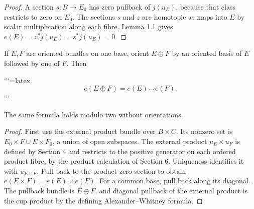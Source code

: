 \begin{proof}
A section \(s:B\to E_0\) has zero pullback of \(j(u_E)\), because that class restricts to zero on \(E_0\). The sections \(s\) and \(z\) are homotopic as maps into \(E\) by scalar multiplication along each fibre. Lemma 1.1 gives
\(e(E)=z^*j(u_E)=s^*j(u_E)=0\).
\end{proof}

\label{courseIII:thom-euler-for-lesson11:CG-S6-CHAIN-PROPOSITION-8.2}

\begin{proposition}
If \(E,F\) are oriented bundles on one base, orient \(E\oplus F\) by an oriented basis of \(E\) followed by one of \(F\). Then



```{=latex}
\[
e(E\oplus F)=e(E)\smile e(F).
\]
```



The same formula holds modulo two without orientations.
\end{proposition}
\begin{proof}
First use the external product bundle over \(B\times C\). Its nonzero set is
\(E_0\times F\cup E\times F_0\), a union of open subspaces. The external product \(u_E\times u_F\) is defined by Section 4 and restricts to the positive generator on each ordered product fibre, by the product calculation of Section 6. Uniqueness identifies it with \(u_{E\times F}\). Pull back to the product zero section to obtain
\(e(E\times F)=e(E)\times e(F)\). For a common base, pull back along its diagonal. The pullback bundle is \(E\oplus F\), and diagonal pullback of the external product is the cup product by the defining Alexander–Whitney formula.
\end{proof}
